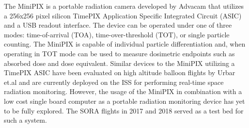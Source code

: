 The MiniPIX is a portable radiation camera developed by Advacam that utilizes a 256x256 pixel silicon TimePIX Application Specific Integrated Circuit (ASIC) and a USB readout interface. The device can be operated under one of three modes: time-of-arrival (TOA), time-over-threshold (TOT), or single particle counting. The MiniPIX is capable of individual particle differentiation and, when operating in TOT mode can be used to measure dosimetric endpoints such as absorbed dose and dose equivalent. Similar devices to the MiniPIX utilizing a TimePIX ASIC have been evaluated on high altitude balloon flights by Urbar et.al\cite{bexus} and are currently deployed on the ISS for performing real-time space radiation monitoring\cite{timepixiss}. However, the usage of the MiniPIX in combination with a low cost single board computer as a portable radiation monitoring device has yet to be fully explored. The SORA flights in 2017 and 2018 served as a test bed for such a system.


%
%

%

